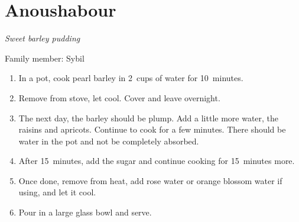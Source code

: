 \chapter{Anoushabour}
\label{ch:anoushabour}



\textit{Sweet barley pudding}

Family member: Sybil

\begin{enumerate}
    \item In a pot, cook pearl barley in 2~cups of water for 10~minutes.
    \item Remove from stove, let cool. Cover and leave overnight.
    \item The next day, the barley should be plump. Add a little more water, the raisins and apricots. Continue to cook for a few minutes. There should be water in the pot and not be completely absorbed.
    \item After 15~minutes, add the sugar and continue cooking for 15~minutes more.
    \item Once done, remove from heat, add rose water or orange blossom water if using, and let it cool.
    \item Pour in a large glass bowl and serve.
\end{enumerate}
